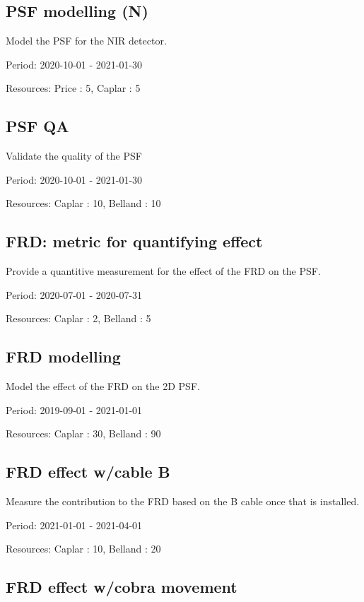 \subsection{PSF modelling (N)}

Model the PSF for the NIR detector.

Period: 2020-10-01 - 2021-01-30

Resources: Price : 5, Caplar : 5

\subsection{PSF QA}

Validate the quality of the PSF

Period: 2020-10-01 - 2021-01-30

Resources: Caplar : 10, Belland : 10

\subsection{FRD: metric for quantifying effect}

Provide a quantitive measurement for the effect of the FRD on the PSF.

Period: 2020-07-01 - 2020-07-31

Resources: Caplar : 2, Belland : 5

\subsection{FRD modelling}

Model the effect of the FRD on the 2D PSF.

Period: 2019-09-01 - 2021-01-01

Resources: Caplar : 30, Belland : 90

\subsection{FRD effect w/cable B}

Measure the contribution to the FRD based on the B cable once that is installed.

Period: 2021-01-01 - 2021-04-01

Resources: Caplar : 10, Belland : 20

\subsection{FRD effect w/cobra movement}

